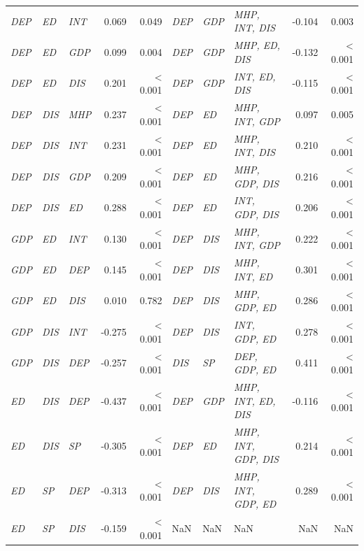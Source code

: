 \begin{tabular}{lllrr|lllrr}
\textit{DEP} & \textit{ED} & \textit{INT} & 0.069 & 0.049 & \textit{DEP} & \textit{GDP} & \textit{MHP, INT, DIS} & -0.104 & 0.003 \\
\textit{DEP} & \textit{ED} & \textit{GDP} & 0.099 & 0.004 & \textit{DEP} & \textit{GDP} & \textit{MHP, ED, DIS} & -0.132 & \textless{} 0.001 \\
\textit{DEP} & \textit{ED} & \textit{DIS} & 0.201 & \textless{} 0.001 & \textit{DEP} & \textit{GDP} & \textit{INT, ED, DIS} & -0.115 & \textless{} 0.001 \\
\textit{DEP} & \textit{DIS} & \textit{MHP} & 0.237 & \textless{} 0.001 & \textit{DEP} & \textit{ED} & \textit{MHP, INT, GDP} & 0.097 & 0.005 \\
\textit{DEP} & \textit{DIS} & \textit{INT} & 0.231 & \textless{} 0.001 & \textit{DEP} & \textit{ED} & \textit{MHP, INT, DIS} & 0.210 & \textless{} 0.001 \\
\textit{DEP} & \textit{DIS} & \textit{GDP} & 0.209 & \textless{} 0.001 & \textit{DEP} & \textit{ED} & \textit{MHP, GDP, DIS} & 0.216 & \textless{} 0.001 \\
\textit{DEP} & \textit{DIS} & \textit{ED} & 0.288 & \textless{} 0.001 & \textit{DEP} & \textit{ED} & \textit{INT, GDP, DIS} & 0.206 & \textless{} 0.001 \\
\textit{GDP} & \textit{ED} & \textit{INT} & 0.130 & \textless{} 0.001 & \textit{DEP} & \textit{DIS} & \textit{MHP, INT, GDP} & 0.222 & \textless{} 0.001 \\
\textit{GDP} & \textit{ED} & \textit{DEP} & 0.145 & \textless{} 0.001 & \textit{DEP} & \textit{DIS} & \textit{MHP, INT, ED} & 0.301 & \textless{} 0.001 \\
\textit{GDP} & \textit{ED} & \textit{DIS} & 0.010 & 0.782 & \textit{DEP} & \textit{DIS} & \textit{MHP, GDP, ED} & 0.286 & \textless{} 0.001 \\
\textit{GDP} & \textit{DIS} & \textit{INT} & -0.275 & \textless{} 0.001 & \textit{DEP} & \textit{DIS} & \textit{INT, GDP, ED} & 0.278 & \textless{} 0.001 \\
\textit{GDP} & \textit{DIS} & \textit{DEP} & -0.257 & \textless{} 0.001 & \textit{DIS} & \textit{SP} & \textit{DEP, GDP, ED} & 0.411 & \textless{} 0.001 \\
\textit{ED} & \textit{DIS} & \textit{DEP} & -0.437 & \textless{} 0.001 & \textit{DEP} & \textit{GDP} & \textit{MHP, INT, ED, DIS} & -0.116 & \textless{} 0.001 \\
\textit{ED} & \textit{DIS} & \textit{SP} & -0.305 & \textless{} 0.001 & \textit{DEP} & \textit{ED} & \textit{MHP, INT, GDP, DIS} & 0.214 & \textless{} 0.001 \\
\textit{ED} & \textit{SP} & \textit{DEP} & -0.313 & \textless{} 0.001 & \textit{DEP} & \textit{DIS} & \textit{MHP, INT, GDP, ED} & 0.289 & \textless{} 0.001 \\
\textit{ED} & \textit{SP} & \textit{DIS} & -0.159 & \textless{} 0.001 & NaN & NaN & NaN & NaN & NaN \\
\bottomrule
\end{tabular}
